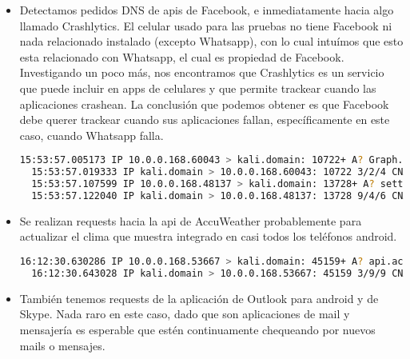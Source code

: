 \begin{itemize}
\begin{lstlisting}[language=bash]
  15:50:57.728650 IP 10.0.0.168.53028 > 239.255.255.250.1900: UDP, length 125
  15:50:57.728679 IP 10.0.0.168.53028 > 239.255.255.250.1900: UDP, length 125
\end{lstlisting}

\item Detectamos pedidos DNS de apis de Facebook, e inmediatamente hacia algo llamado Crashlytics. El celular usado para las pruebas no 
tiene Facebook ni nada relacionado instalado (excepto Whatsapp), con lo cual intuímos que esto esta relacionado con Whatsapp, el cual 
es propiedad de Facebook. Investigando un poco más, nos encontramos que Crashlytics es un servicio que puede incluir en apps de 
celulares y que permite trackear cuando las aplicaciones crashean. La conclusión que podemos obtener es que Facebook debe 
querer trackear cuando sus aplicaciones fallan, específicamente en este caso, cuando Whatsapp falla.

\begin{lstlisting}[language=bash]
  15:53:57.005173 IP 10.0.0.168.60043 > kali.domain: 10722+ A? Graph.facebook.com. (36)
  15:53:57.019333 IP kali.domain > 10.0.0.168.60043: 10722 3/2/4 CNAME api.facebook.com., CNAME star.c10r.facebook.com., A 179.60.193.16 (217)
  15:53:57.107599 IP 10.0.0.168.48137 > kali.domain: 13728+ A? settings.crashlytics.com. (42)
  15:53:57.122040 IP kali.domain > 10.0.0.168.48137: 13728 9/4/6 CNAME settings-crashlytics-b-103974621.us-east-1.elb.amazonaws.com., A 23.23.141.81, A 23.23.115.241, A 23.23.154.246, A 23.23.135.166, A 23.23.100.184, A 23.23.159.200, A 23.23.145.88, A 23.23.151.233 (498)
\end{lstlisting}

\item Se realizan requests hacia la api de AccuWeather probablemente para actualizar el clima que muestra integrado en casi todos los 
teléfonos android.

\begin{lstlisting}[language=bash]
  16:12:30.630286 IP 10.0.0.168.53667 > kali.domain: 45159+ A? api.accuweather.com. (37)
  16:12:30.643028 IP kali.domain > 10.0.0.168.53667: 45159 3/9/9 CNAME api.accuweather.com.edgekey.net., CNAME e10414.g.akamaiedge.net., A 23.12.155.157 (450)
\end{lstlisting}

\item También tenemos requests de la aplicación de Outlook para android y de Skype. Nada raro en este caso, dado que son aplicaciones de 
mail y mensajería es esperable que estén continuamente chequeando por nuevos mails o mensajes.


\end{itemize}
